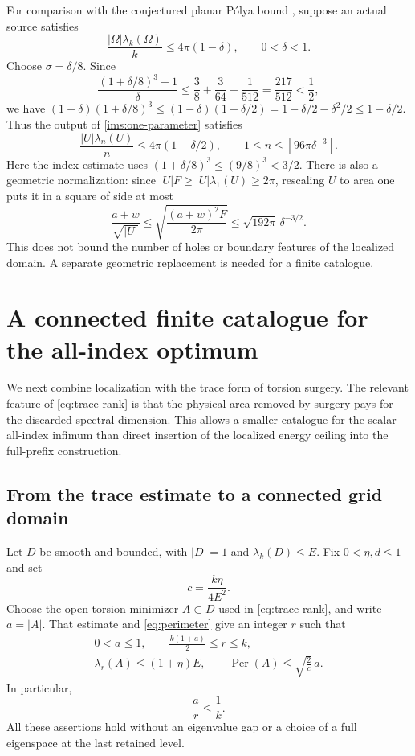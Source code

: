 \documentclass[11pt,reqno]{amsart}
\numberwithin{equation}{section}
\newcommand{\abs}[1]{\lvert#1\rvert}
\newcommand{\Om}{\Omega}
\begin{document}
For comparison with the conjectured planar P\'olya bound \cite{Polya1961},
suppose an actual source satisfies
\[
 \frac{\abs{\Om}\lambda_k(\Om)}k\leq4\pi(1-\delta),
 \qquad 0<\delta<1.
\]
Choose $\sigma=\delta/8$.  Since
\[
 \frac{(1+\delta/8)^3-1}{\delta}
   \leq\frac38+\frac3{64}+\frac1{512}
   =\frac{217}{512}<\frac12,
\]
we have
$(1-\delta)(1+\delta/8)^3
 \leq(1-\delta)(1+\delta/2)
 =1-\delta/2-\delta^2/2\leq1-\delta/2$.
Thus the output of \eqref{ims:one-parameter} satisfies
\begin{equation}
 \frac{\abs U\lambda_n(U)}n\leq4\pi(1-\delta/2),
 \qquad
 1\leq n\leq\left\lfloor96\pi\delta^{-3}\right\rfloor.
 \label{ims:localized-deficit}
\end{equation}
Here the index estimate uses
$(1+\delta/8)^3\leq(9/8)^3<3/2$.
There is also a geometric normalization: since
$\abs U F\geq\abs U\lambda_1(U)\geq2\pi$, rescaling $U$ to
area one puts it in a square of side at most
\[
 \frac{a+w}{\sqrt{\abs U}}
   \leq\sqrt{\frac{(a+w)^2F}{2\pi}}
   \leq\sqrt{192\pi}\,\delta^{-3/2}.
\]
This does not bound the number of holes or boundary features of the
localized domain.  A separate geometric replacement is needed for a
finite catalogue.

\section{A connected finite catalogue for the all-index optimum}
\label{global:section}

We next combine localization with the trace form of torsion surgery.
The relevant feature of \eqref{eq:trace-rank} is that the physical
area removed by surgery pays for the discarded spectral dimension.
This allows a smaller catalogue for the scalar all-index infimum
than direct insertion of the localized energy ceiling into the
full-prefix construction.

\subsection{From the trace estimate to a connected grid domain}
\label{global:trace-grid-section}

Let $D$ be smooth and bounded, with $\abs D=1$ and
$\lambda_k(D)\leq E$.  Fix $0<\eta,d\leq1$ and set
\[
 c=\frac{k\eta}{4E^2}.
\]
Choose the open torsion minimizer $A\subset D$ used in
\eqref{eq:trace-rank}, and write $a=\abs A$.  That estimate and
\eqref{eq:perimeter} give an integer $r$ such that
\begin{equation}
 \begin{gathered}
 0<a\leq1,\qquad \frac{k(1+a)}2\leq r\leq k,\\
 \lambda_r(A)\leq(1+\eta)E,\qquad
 \operatorname{Per}(A)\leq\sqrt{\frac2c}\,a.
 \end{gathered}
 \label{global:trace-input}
\end{equation}
In particular,
\begin{equation}
 \frac ar\leq\frac1k.
 \label{global:area-rank}
\end{equation}
All these assertions hold without an eigenvalue gap or a choice of
a full eigenspace at the last retained level.
\end{document}

